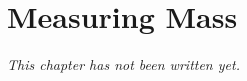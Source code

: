 \chapter{Measuring Mass}\label{ch:g3:measuring-mass}


\emph{This chapter has not been written yet.}
